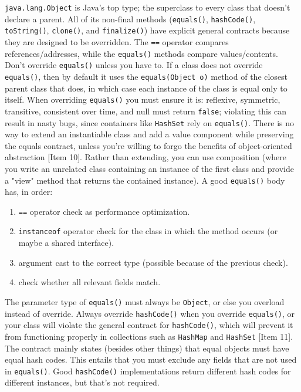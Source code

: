 \documentclass[8pt, table, xcdraw]{article}%
\begin{document}
\lstinline{java.lang.Object} is Java's top type; the superclass to every class that doesn't declare a parent. All of its non-final methods (\lstinline{equals()}, \lstinline{hashCode()}, \lstinline{toString()}, \lstinline{clone()}, and \lstinline{finalize()}) have explicit general contracts because they are designed to be overridden. The \lstinline{==} operator compares references/addresses, while the \lstinline{equals()} methods compare values/contents. Don't override \lstinline{equals()} unless you have to. If a class does not override \lstinline{equals()}, then by default it uses the \lstinline{equals(Object o)} method of the closest parent class that does, in which case each instance of the class is equal only to itself. When overriding \lstinline{equals()} you must ensure it is: reflexive, symmetric, transitive, consistent over time, and null must return \lstinline{false}; violating this can result in nasty bugs, since containers like \lstinline{HashSet} rely on \lstinline{equals()}. There is no way to extend an instantiable class and add a value component while preserving the equals contract, unless you're willing to forgo the benefits of object-oriented abstraction [Item 10]. Rather than extending, you can use composition (where you write an unrelated class containing an instance of the first class and provide a "view" method that returns the contained instance). A good \lstinline{equals()} body has, in order:

\begin{enumerate}
    \item \lstinline{==} operator check as performance optimization.
    \item \lstinline{instanceof} operator check for the  class in which the method occurs (or maybe a shared interface).
    \item argument cast to the correct type (possible because of the previous check).
    \item check whether all relevant fields match.
\end{enumerate}

The parameter type of \lstinline{equals()} must always be \lstinline{Object}, or else you overload instead of override. Always override \lstinline{hashCode()} when you override \lstinline{equals()}, or your class will violate the general contract for \lstinline{hashCode()}, which will prevent it from functioning properly in collections such as \lstinline{HashMap} and \lstinline{HashSet} [Item 11]. The contract mainly states (besides other things) that equal objects must have equal hash codes. This entails that you must exclude any fields that are not used in \lstinline{equals()}. Good \lstinline{hashCode()} implementations return different hash codes for different instances, but that's not required.
\end{document}
